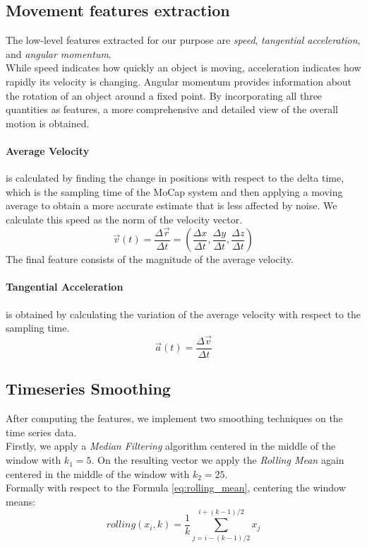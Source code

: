 \subsection{Movement features extraction}
\label{subsec:alg_features}
The low-level features extracted for our purpose are \textit{speed}, \textit{tangential acceleration}, and \textit{angular momentum}. \\
While speed indicates how quickly an object is moving, acceleration indicates how rapidly its velocity is changing.
Angular momentum provides information about the rotation of an object around a fixed point.
By incorporating all three quantities as features, a more comprehensive and detailed view of the overall motion is obtained.

\paragraph{Average Velocity} is calculated by finding the change in positions with respect to the delta time, which is the sampling time of the MoCap system and then applying a moving average to obtain a more accurate estimate that is less affected by noise.
We calculate this speed as the norm of the velocity vector.
\begin{equation}
  \vec{v}(t) = \frac{\Delta\vec{r}}{\Delta  t} = \left(\frac{\Delta x}{\Delta t}, \frac{\Delta  y}{\Delta t}, \frac{\Delta z}{\Delta t}\right)
\end{equation}
The final feature consists of the magnitude of the average velocity.

\paragraph{Tangential Acceleration} is obtained by calculating the variation of the average velocity with respect to the sampling time.
\begin{equation}
  \vec{a}(t) = \frac{\Delta\vec{v}}{\Delta t}
\end{equation}

\subsection{Timeseries Smoothing}
After computing the features, we implement two smoothing techniques on the time series data. \\
Firstly, we apply a \textit{Median Filtering} algorithm centered in the middle of the window with $k_1 = 5$. 
On the resulting vector we apply the \textit{Rolling Mean} again centered in the middle of the window with $k_2 = 25 $. \\
Formally with respect to the Formula \ref{eq:rolling_mean}, centering the window means:
\begin{equation}
  rolling(x_i,k) = \frac{1}{k} \sum_{j=i-(k-1)/2}^{i+(k-1)/2} x_j
\end{equation}

